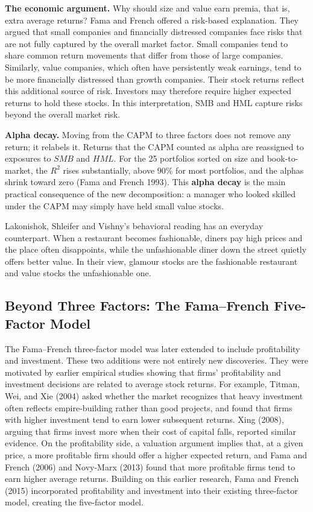 \textbf{The economic argument.} Why should size and value earn premia, that is, extra average returns? 
Fama and French offered a risk-based explanation. They argued that small companies and financially distressed companies face risks that are not fully captured by the overall market factor. Small companies tend to share common return movements that differ from those of large companies. Similarly, value companies, which often have persistently weak earnings, tend to be more financially distressed than growth companies. Their stock returns reflect this additional source of risk. Investors may therefore require higher expected returns to hold these stocks. In this interpretation, SMB and HML capture risks beyond the overall market risk.

\textbf{Alpha decay.} Moving from the CAPM to three factors does not remove any return; it relabels it. Returns that the CAPM counted as alpha are reassigned to exposures to $SMB$ and $HML$. For the 25 portfolios sorted on size and book-to-market, the $R^2$ rises substantially, above 90\% for most portfolios, and the alphas shrink toward zero (Fama and French 1993). This \textbf{alpha decay} is the main practical consequence of the new decomposition: a manager who looked skilled under the CAPM may simply have held small value stocks.

Lakonishok, Shleifer and Vishny's behavioral reading has an everyday counterpart. When a restaurant becomes fashionable, diners pay high prices and the place often disappoints, while the unfashionable diner down the street quietly offers better value. In their view, glamour stocks are the fashionable restaurant and value stocks the unfashionable one.


\subsection{Beyond Three Factors: The Fama--French Five-Factor Model}
\label{sec:04-multifactor}

The Fama--French three-factor model was later extended to include profitability and investment. These two additions were not entirely new
discoveries. They were motivated by earlier empirical studies showing that firms' profitability and investment decisions are related to
average stock returns. For example, Titman, Wei, and Xie (2004) asked whether the market recognizes that heavy investment often reflects empire-building rather than
good projects, and found that firms with higher investment tend to earn lower subsequent returns. Xing (2008), arguing that firms invest more
when their cost of capital falls, reported similar evidence. On the profitability side, a valuation argument implies that, at a given price, a more
profitable firm should offer a higher expected return, and Fama and French (2006) and Novy-Marx (2013) found that more
profitable firms tend to earn higher average returns. Building on this earlier research, Fama and French (2015) incorporated profitability
and investment into their existing three-factor model, creating the five-factor model.

